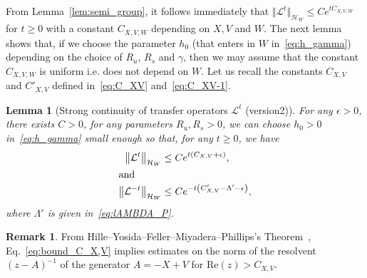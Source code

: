 \documentclass[10pt]{amsart}
\newtheorem{lemm}[theo]{Lemma}\newtheorem{prop}[theo]{Proposition}\newtheorem{coro}[theo]{Corollary}\newtheorem{conj}[theo]{Conjecture}
\theoremstyle{definition}\newtheorem{defi}[theo]{Definition}\newtheorem{rema}[theo]{Remark}\newtheorem{exam}[theo]{Example}\newtheorem{exem}[theo]{Example}\newtheorem{nota}[theo]{Notation}
\newcommand{\clH}{\mathcal{H}}
\newcommand{\clL}{\mathcal{L}}
\newcommand{\Ree}{\mathrm{Re}}
\begin{document}
From Lemma~\ref{lem:semi_group}, it follows immediately that $\Vert \clL^{t}\Vert _{\clH _{W}}\leq Ce^{tC_{X,V,W}}$ for $t\ge0$ with a constant $C_{X,V,W}$ depending on $X,V$ and $W$. The next lemma shows that, if we choose the parameter $h_{0}$ (that enters in $W$ in~\eqref{eq:h_gamma}) depending on the choice of $R_{u}$, $R_{s}$ and $\gamma$, then we may assume that the constant $C_{X,V,W}$ is uniform i.e. does not depend on $W$. Let us recall the constants $C_{X,V}$ and $C'_{X,V}$ defined in~\eqref{eq:C_XV} and~\eqref{eq:C_XV-1}.

\begin{cBoxB}{}
\begin{lemm}[Strong continuity of transfer operators $\clL^{t}$ (version2)]\label{lem:For-the-weight}
For any $\epsilon>0$, there exists $C>0$, for any parameters $R_{u},R_{s}>0$, we can choose $h_{0}>0$ in~\eqref{eq:h_gamma} small enough so that, for any $t\geq0$, we have
\begin{align}
\left\Vert \clL^{t}\right\Vert _{\clH _{W}} &\leq Ce^{t\left(C_{X,V}+\epsilon\right)},\label{eq:bound_C_X,V}
\\
\intertext{and}
\left\Vert \clL^{-t}\right\Vert _{\clH _{W}} &\leq Ce^{-t\left(C'_{X,V}-\Lambda'-\epsilon\right)},\label{eq:bound_C_X,V-1}
\end{align}
where $\Lambda'$ is given in~\eqref{eq:lAMBDA_P}.
\end{lemm}
\end{cBoxB}

\begin{rema}
From Hille--Yosida--Feller--Miyadera--Phillips's Theorem~\cite[p.~77]{engel_1999}, Eq.~\eqref{eq:bound_C_X,V} implies estimates on the norm of the resolvent $(z-A)^{-1}$ of the generator $A=-X+V$ for $\Ree(z)>C_{X,V}$.
\end{rema}
\end{document}
